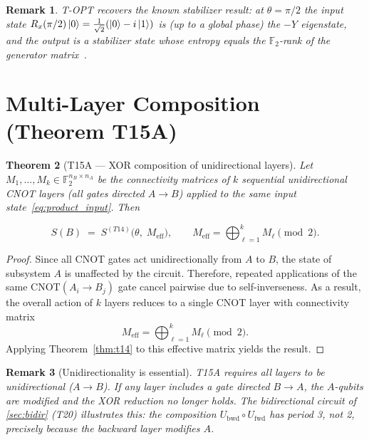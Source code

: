 \documentclass[11pt,a4paper]{article}
\newtheorem{theorem}{Theorem}[section]
\newtheorem{remark}[theorem]{Remark}
\newcommand{\F}{\mathbb{F}}
\newcommand{\VNE}{S}
\begin{document}
\begin{remark}
T-OPT recovers the known stabilizer result: at $\theta = \pi/2$ the input
state $R_x(\pi/2)\ket{0} = \frac{1}{\sqrt{2}}(\ket{0}-i\ket{1})$ is (up to
a global phase) the $-Y$ eigenstate, and the output is a stabilizer state
whose entropy equals the $\F_2$-rank of the generator
matrix~\cite{fattal2004entanglement,audenaert2005entanglement}.
\end{remark}

\section{Multi-Layer Composition (Theorem T15A)}
\label{sec:layers}

\begin{theorem}[T15A --- XOR composition of unidirectional layers]
\label{thm:t15a}
Let $M_1, \dotsc, M_k \in \F_2^{n_B \times n_A}$ be the connectivity
matrices of $k$ sequential \emph{unidirectional} CNOT layers (all gates
directed $A \to B$) applied to the same input state~\eqref{eq:product_input}.
Then

\begin{equation}
  \VNE(B) \;=\; \VNE^{(T14)}\!\bigl(\theta,\; M_{\mathrm{eff}}\bigr),
  \qquad
  M_{\mathrm{eff}} = \bigoplus_{\ell=1}^{k} M_\ell \pmod{2}.
  \label{eq:t15a}
\end{equation}
\end{theorem}

\begin{proof}
Since all CNOT gates act unidirectionally from $A$ to $B$, the state of
subsystem $A$ is unaffected by the circuit.  Therefore, repeated applications
of the same $\mathrm{CNOT}(A_i \to B_j)$ gate cancel pairwise due to
self-inverseness.  As a result, the overall action of $k$ layers reduces to a
single CNOT layer with connectivity matrix
\[
  M_{\mathrm{eff}} = \bigoplus_{\ell=1}^{k} M_\ell \pmod{2}.
\]
Applying Theorem~\ref{thm:t14} to this effective matrix yields the result.
\end{proof}

\begin{remark}[Unidirectionality is essential]
\label{rem:unidirectional}
T15A requires all layers to be unidirectional ($A \to B$).  If any layer
includes a gate directed $B \to A$, the $A$-qubits are modified and the
XOR reduction no longer holds.  The bidirectional circuit of \cref{sec:bidir}
(T20) illustrates this: the composition $U_{\mathrm{bwd}} \circ U_{\mathrm{fwd}}$
has period 3, not 2, precisely because the backward layer modifies $A$.
\end{remark}
\end{document}
